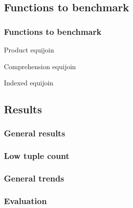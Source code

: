 \documentclass{beamer}
\begin{document}
\subsection{Functions to benchmark}
\begin{frame}
\frametitle{Functions to benchmark}
\begin{block}{Product equijoin}
    \vspace{-4mm}
    {\scriptsize}
    \vspace{-7mm}
\end{block}\pause
\begin{block}{Comprehension equijoin}
    \vspace{-4mm}
    {\scriptsize}
    \vspace{-7mm}
\end{block}\pause
\begin{block}{Indexed equijoin}
    \vspace{-4mm}
    {\scriptsize}
    \vspace{-7mm}
\end{block}
\end{frame}

\subsection{Results}
\begin{frame}
\frametitle{General results}

\begin{table}[p]
    \centering
    
    \caption{Percentage change of mean time to complete query `join onePercent
        and onePercent' when using indexed equijoin compared to other
    functions.}
    \label{tab:percentage-change-of-means-join-onePercent-and-onePercent}
\end{table}
\end{frame}

\begin{frame}
\frametitle{Low tuple count}

\end{frame}

\begin{frame}
\frametitle{General trends}

\end{frame}

\begin{frame}
\frametitle{Evaluation}
\begin{table}
{\footnotesize}
\caption{A table showing the mean time (s) and standard deviation (s) to
complete the query `join onePercent and fiftyPercent' for each function.}
\end{table}
\end{frame}
\end{document}
